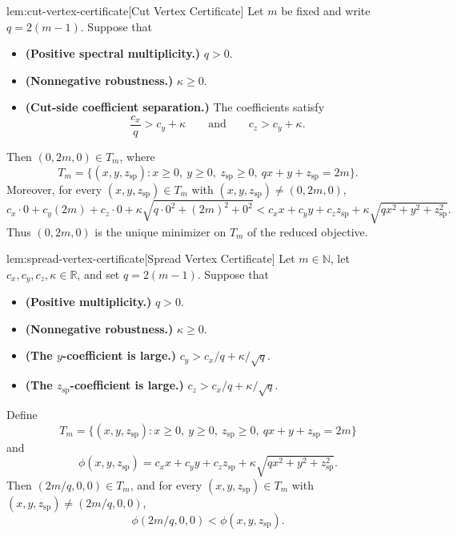 \begin{lemmav}{lem:cut-vertex-certificate}[Cut Vertex Certificate]
Let \(m\) be fixed and write \(q=2(m-1)\). Suppose that
\begin{itemize}
\item \textbf{(Positive spectral multiplicity.)} \(q>0\).
\item \textbf{(Nonnegative robustness.)} \(\kappa\ge 0\).
\item \textbf{(Cut-side coefficient separation.)} The coefficients satisfy
\[
\frac{c_x}{q}>c_y+\kappa
\qquad\text{and}\qquad
c_z>c_y+\kappa .
\]
\end{itemize}
Then \((0,2m,0)\in T_m\), where
\[
T_m=\{(x,y,z_{\mathrm{sp}}): x\ge 0,\ y\ge 0,\ z_{\mathrm{sp}}\ge 0,\ qx+y+z_{\mathrm{sp}}=2m\}.
\]
Moreover, for every \((x,y,z_{\mathrm{sp}})\in T_m\) with
\((x,y,z_{\mathrm{sp}})\neq (0,2m,0)\),
\[
c_x\cdot 0+c_y(2m)+c_z\cdot 0
+\kappa\sqrt{q\cdot 0^2+(2m)^2+0^2}
<
c_xx+c_yy+c_zz_{\mathrm{sp}}
+\kappa\sqrt{qx^2+y^2+z_{\mathrm{sp}}^2}.
\]
Thus \((0,2m,0)\) is the unique minimizer on \(T_m\) of the reduced objective.
\end{lemmav}

\begin{lemmav}{lem:spread-vertex-certificate}[Spread Vertex Certificate]
Let \(m\in\mathbb N\), let \(c_x,c_y,c_z,\kappa\in\mathbb R\), and set \(q=2(m-1)\). Suppose that
\begin{itemize}
\item \textbf{(Positive multiplicity.)} \(q>0\).
\item \textbf{(Nonnegative robustness.)} \(\kappa\ge 0\).
\item \textbf{(The \(y\)-coefficient is large.)} \(c_y>c_x/q+\kappa/\sqrt q\).
\item \textbf{(The \(z_{\mathrm{sp}}\)-coefficient is large.)} \(c_z>c_x/q+\kappa/\sqrt q\).
\end{itemize}
Define
\[
T_m=\{(x,y,z_{\mathrm{sp}}):x\ge0,\ y\ge0,\ z_{\mathrm{sp}}\ge0,\ qx+y+z_{\mathrm{sp}}=2m\}
\]
and
\[
\phi(x,y,z_{\mathrm{sp}})
=
c_xx+c_yy+c_zz_{\mathrm{sp}}
+\kappa\sqrt{qx^2+y^2+z_{\mathrm{sp}}^2}.
\]
Then \((2m/q,0,0)\in T_m\), and for every \((x,y,z_{\mathrm{sp}})\in T_m\) with
\((x,y,z_{\mathrm{sp}})\neq (2m/q,0,0)\),
\[
\phi(2m/q,0,0)<\phi(x,y,z_{\mathrm{sp}}).
\]
\end{lemmav}

